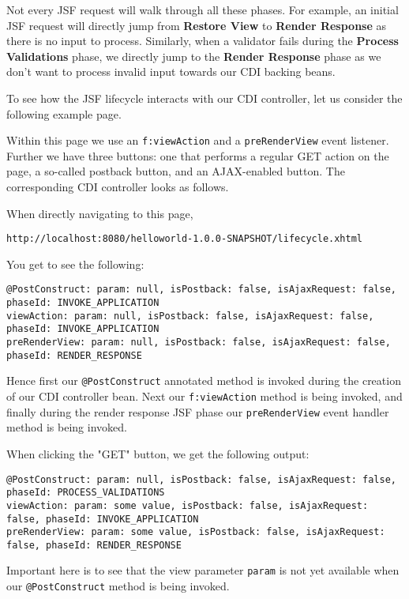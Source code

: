 Not every JSF request will walk through all these phases. For example, an initial JSF request will directly jump from \textbf{Restore View} to \textbf{Render Response} as there is no input to process.
Similarly, when a validator fails during the \textbf{Process Validations} phase, we directly jump to the \textbf{Render Response} phase as we don't want to process invalid input towards our CDI backing beans.

To see how the JSF lifecycle interacts with our CDI controller, let us consider the following example page.

Within this page we use an \texttt{f:viewAction} and a \texttt{preRenderView} event listener.
Further we have three buttons: one that performs a regular GET action on the page, a so-called postback button, and an AJAX-enabled button.
The corresponding CDI controller looks as follows.

When directly navigating to this page,
\begin{lstlisting}
http://localhost:8080/helloworld-1.0.0-SNAPSHOT/lifecycle.xhtml
\end{lstlisting}
You get to see the following:
\begin{lstlisting}
@PostConstruct: param: null, isPostback: false, isAjaxRequest: false, phaseId: INVOKE_APPLICATION
viewAction: param: null, isPostback: false, isAjaxRequest: false, phaseId: INVOKE_APPLICATION
preRenderView: param: null, isPostback: false, isAjaxRequest: false, phaseId: RENDER_RESPONSE
\end{lstlisting}
Hence first our \texttt{@PostConstruct} annotated method is invoked during the creation of our CDI controller bean.
Next our \texttt{f:viewAction} method is being invoked, and finally during the render response JSF phase our \texttt{preRenderView} event handler method is being invoked.

When clicking the "GET" button, we get the following output:
\begin{lstlisting}
@PostConstruct: param: null, isPostback: false, isAjaxRequest: false, phaseId: PROCESS_VALIDATIONS
viewAction: param: some value, isPostback: false, isAjaxRequest: false, phaseId: INVOKE_APPLICATION
preRenderView: param: some value, isPostback: false, isAjaxRequest: false, phaseId: RENDER_RESPONSE
\end{lstlisting}
Important here is to see that the view parameter \texttt{param} is not yet available when our \texttt{@Post\allowbreak Construct} method is being invoked.

